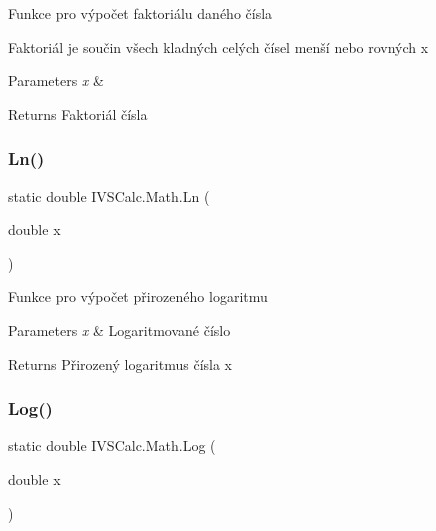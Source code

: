 Funkce pro výpočet faktoriálu daného čísla 

Faktoriál je součin všech kladných celých čísel menší nebo rovných x 
\begin{DoxyParams}{Parameters}
{\em x} & \\
\hline
\end{DoxyParams}
\begin{DoxyReturn}{Returns}
Faktoriál čísla
\end{DoxyReturn}
\mbox{\label{class_i_v_s_calc_1_1_math_a6c1a07d2ba9837900a6d1c34c9a77b22}} 
\subsubsection{\texorpdfstring{Ln()}{Ln()}}
{\footnotesize\ttfamily static double I\+V\+S\+Calc.\+Math.\+Ln (\begin{DoxyParamCaption}\item[{double}]{x }\end{DoxyParamCaption})\hspace{0.3cm}{\ttfamily [static]}}



Funkce pro výpočet přirozeného logaritmu 


\begin{DoxyParams}{Parameters}
{\em x} & Logaritmované číslo\\
\hline
\end{DoxyParams}
\begin{DoxyReturn}{Returns}
Přirozený logaritmus čísla x
\end{DoxyReturn}
\mbox{\label{class_i_v_s_calc_1_1_math_a4c872cd713ef445303a2034eb67003be}} 
\subsubsection{\texorpdfstring{Log()}{Log()}}
{\footnotesize\ttfamily static double I\+V\+S\+Calc.\+Math.\+Log (\begin{DoxyParamCaption}\item[{double}]{x }\end{DoxyParamCaption})\hspace{0.3cm}{\ttfamily [static]}}



